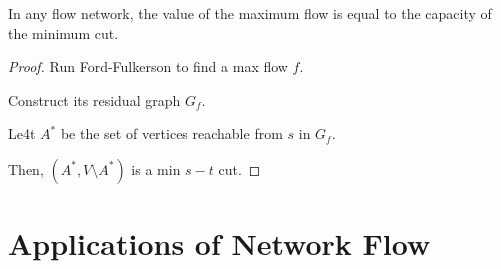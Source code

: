 \begin{theorem}
    In any flow network, the value of the maximum flow is equal to the capacity of the minimum cut.
\end{theorem}

\begin{proof}
    Run Ford-Fulkerson to find a max flow $f$. 

    Construct its residual graph $G_f$. 

    Le4t $A^*$ be the set of vertices reachable from $s$ in $G_f$.

    Then, $(A^*, V \setminus A^*)$ is a min $s-t$ cut.
\end{proof}

\section{Applications of Network Flow}

